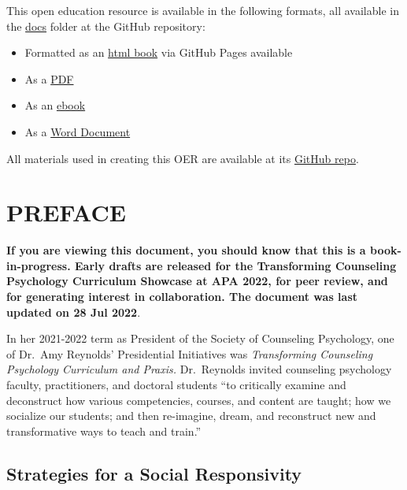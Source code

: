 \documentclass[
  11pt,
]{book}
\providecommand{\tightlist}{%
  \setlength{\itemsep}{0pt}\setlength{\parskip}{0pt}}
\begin{document}
This open education resource is available in the following formats, all available in the \href{https://github.com/lhbikos/TransformingResearchMethods/tree/main/docs}{docs} folder at the GitHub repository:

\begin{itemize}
\tightlist
\item
  Formatted as an \href{https://lhbikos.github.io/TransformingResearchMethods/}{html book} via GitHub Pages available
\item
  As a \href{https://github.com/lhbikos/TransformingResearchMethods/blob/main/docs/TransformingResearchMethods.pdf}{PDF}
\item
  As an \href{https://github.com/lhbikos/TransformingResearchMethods/blob/main/docs/TransformingResearchMethods.epub}{ebook}
\item
  As a \href{https://github.com/lhbikos/TransformingResearchMethods/blob/main/docs/TransformingResearchMethods.docx}{Word Document}
\end{itemize}

All materials used in creating this OER are available at its \href{https://github.com/lhbikos/TransformingResearchMethods}{GitHub repo}.

\hypertarget{preface}{%
\chapter*{PREFACE}\label{preface}}

\textbf{If you are viewing this document, you should know that this is a book-in-progress. Early drafts are released for the Transforming Counseling Psychology Curriculum Showcase at APA 2022, for peer review, and for generating interest in collaboration. The document was last updated on 28 Jul 2022}.

In her 2021-2022 term as President of the Society of Counseling Psychology, one of Dr.~Amy Reynolds' Presidential Initiatives was \emph{Transforming Counseling Psychology Curriculum and Praxis.} Dr.~Reynolds invited counseling psychology faculty, practitioners, and doctoral students ``to critically examine and deconstruct how various competencies, courses, and content are taught; how we socialize our students; and then re-imagine, dream, and reconstruct new and transformative ways to teach and train.''

\hypertarget{strategies-for-a-social-responsivity}{%
\section*{Strategies for a Social Responsivity}\label{strategies-for-a-social-responsivity}}
\end{document}
